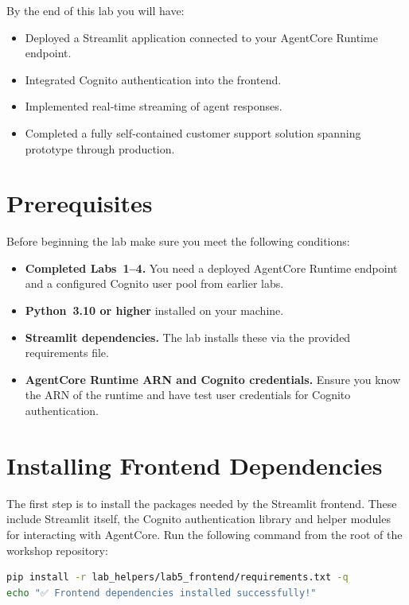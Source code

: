 By the end of this lab you will have:

\begin{itemize}
  \item Deployed a Streamlit application connected to your AgentCore
        Runtime endpoint.
  \item Integrated Cognito authentication into the frontend.
  \item Implemented real‑time streaming of agent responses.
  \item Completed a fully self‑contained customer support solution
        spanning prototype through production.
\end{itemize}

\section{Prerequisites}

Before beginning the lab make sure you meet the following conditions:

\begin{itemize}
  \item \textbf{Completed Labs 1–4.}  You need a deployed AgentCore
        Runtime endpoint and a configured Cognito user pool from
        earlier labs.
  \item \textbf{Python 3.10 or higher} installed on your machine.
  \item \textbf{Streamlit dependencies.}  The lab installs these via
        the provided requirements file.
  \item \textbf{AgentCore Runtime ARN and Cognito credentials.}
        Ensure you know the ARN of the runtime and have test user
        credentials for Cognito authentication.
\end{itemize}

\section{Installing Frontend Dependencies}

The first step is to install the packages needed by the Streamlit
frontend.  These include Streamlit itself, the Cognito
authentication library and helper modules for interacting with AgentCore.
Run the following command from the root of the workshop repository:

\begin{lstlisting}[language=bash]
pip install -r lab_helpers/lab5_frontend/requirements.txt -q
echo "✅ Frontend dependencies installed successfully!"
\end{lstlisting}

